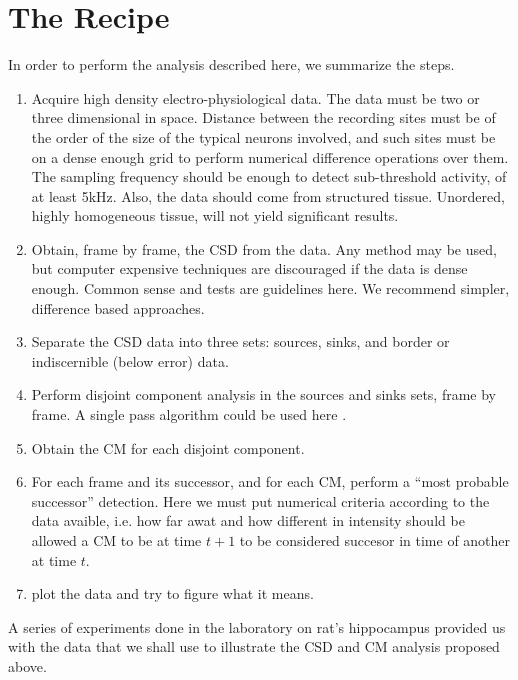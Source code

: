 \documentclass{article}
\begin{document}
 
 \section{The Recipe}
 
 In order to perform the analysis described here, we summarize the steps.
 \begin{enumerate}
 \item Acquire high density electro-physiological data. The data must be two or three dimensional in space. Distance between the recording sites must be of the order of the size of the typical neurons involved, and such sites must be on a dense enough grid to perform numerical difference operations over them. The sampling frequency should be enough to detect sub-threshold activity, of at least 5kHz. Also, the data should come from structured tissue. Unordered, highly homogeneous tissue, will not yield significant results. 
\item Obtain, frame by frame, the CSD from the data. Any method may be used, but computer expensive techniques are discouraged if the data is dense enough. Common sense and tests are guidelines here. We recommend simpler, difference based approaches. 
\item Separate the CSD data into three sets: sources, sinks, and border or indiscernible (below error) data.
\item Perform disjoint component analysis in the sources and sinks sets, frame by frame.
  A single pass algorithm could be used here \cite{Vincent91, Abubaker07}.
\item  Obtain the CM for each disjoint component.
\item For each frame and its successor, and for each CM, perform a ``most probable successor'' detection. Here we must put numerical criteria according to the data avaible, i.e. how far awat and how different in intensity should be allowed a CM to be at time $t+1$ to be considered succesor in time of another at time $t$.
  \item plot the data and try to figure what it means.
\end{enumerate}

A series of experiments done in the laboratory on rat's hippocampus provided us with the data that we shall use to illustrate the CSD and CM analysis proposed above. 
\end{document}
